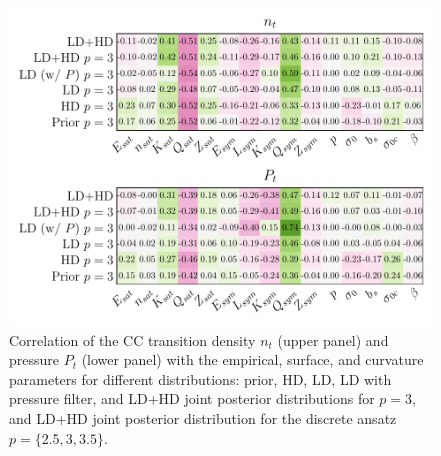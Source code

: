 \begin{figure}[!t]
  \begin{center}
    \includegraphics[width=\linewidth]{figures/corr_ntpt_pars.pdf}
  \end{center}
  \caption[Correlation of the crust-core transition density and pressure with 
  the equation of state parameters for different filters]{Correlation of the CC 
    transition 
    density $n_t$ (upper panel) and pressure $P_t$ (lower panel) with the
    empirical, surface, and curvature parameters for different distributions: 
    prior, HD, LD, LD with pressure filter, and LD+HD joint posterior 
    distributions for $p=3$, and LD+HD joint posterior distribution for the 
    discrete ansatz $p=\{2.5,3,3.5\}$.}\label{fig:corr_ntpt_pars}
\end{figure}

